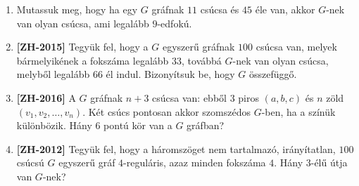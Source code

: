 \documentclass[a4paper,12pt]{article}
\begin{document}
\begin{enumerate}
        \hrule


        
        
        \item Mutassuk meg, hogy ha egy $G$ gráfnak $11$ csúcsa és $45$ éle van, akkor $G$-nek van olyan csúcsa, ami legalább $9$-edfokú.
        
        \item \textbf{[ZH-2015]} Tegyük fel, hogy a $G$ egyszerű gráfnak $100$ csúcsa van, melyek bármelyikének a fokszáma legalább $33$, továbbá $G$-nek van olyan csúcsa, melyből legalább $66$ él indul. Bizonyítsuk be, hogy $G$ összefüggő.
        
        \item \textbf{[ZH-2016]} A $G$ gráfnak $n+3$ csúcsa van: ebből $3$ piros $(a, b, c)$ és $n$ zöld $(v_1, v_2, \ldots, v_n)$. Két csúcs pontosan akkor szomszédos $G$-ben, ha a színük különbözik. Hány $6$ pontú kör van a $G$ gráfban?
        
        \item \textbf{[ZH-2012]} Tegyük fel, hogy a háromszöget nem tartalmazó, irányítatlan, $100$ csúcsú $G$ egyszerű gráf $4$-reguláris, azaz minden fokszáma $4$. Hány $3$-élű útja van $G$-nek?
        
        
        


\end{enumerate}
\end{document}
